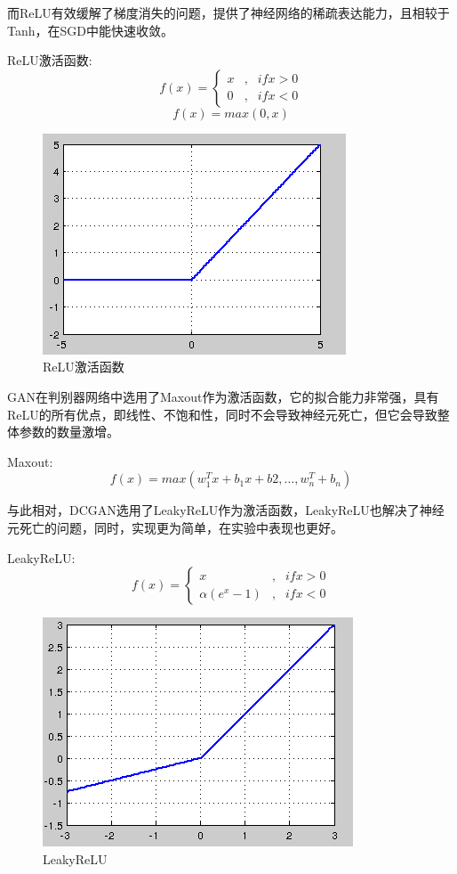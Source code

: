 \documentclass[hyperref, a4paper]{ctexart}
\begin{document}
而ReLU有效缓解了梯度消失的问题，提供了神经网络的稀疏表达能力，且相较于Tanh，在SGD中能快速收敛。

ReLU激活函数: \[
f(x)=\left\{
\begin{aligned}
x & ,& if x>0 \\
0 & , & if x < 0 
\end{aligned}
\right.
\] \[f(x)=max(0,x)\]

\begin{figure}
\centering
\includegraphics{./15.jpg}
\caption{ReLU激活函数}
\end{figure}

GAN在判别器网络中选用了Maxout作为激活函数，它的拟合能力非常强，具有ReLU的所有优点，即线性、不饱和性，同时不会导致神经元死亡，但它会导致整体参数的数量激增。

Maxout:\[f(x)=max(w^T_1x +b_1x+b2,…,w_n^T+b_n)\]

与此相对，DCGAN选用了LeakyReLU作为激活函数，LeakyReLU也解决了神经元死亡的问题，同时，实现更为简单，在实验中表现也更好。

LeakyReLU: \[ 
f(x)=\left\{
\begin{aligned}
x & ,& if x>0 \\
\alpha(e^x-1) & , & if x < 0 
\end{aligned}
\right.
\]

\begin{figure}
\centering
\includegraphics{./18.jpg}
\caption{LeakyReLU}
\end{figure}
\end{document}
